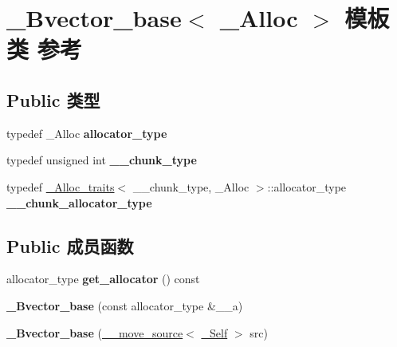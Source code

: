 \hypertarget{class___bvector__base}{}\section{\+\_\+\+Bvector\+\_\+base$<$ \+\_\+\+Alloc $>$ 模板类 参考}
\label{class___bvector__base}
\subsection*{Public 类型}
\begin{DoxyCompactItemize}
\item 
\mbox{\label{class___bvector__base_a79d8b0ab0a93495312341dc18a9563a1}} 
typedef \+\_\+\+Alloc {\bfseries allocator\+\_\+type}
\item 
\mbox{\label{class___bvector__base_a19e33337e31301ec461cfc6e481de671}} 
typedef unsigned int {\bfseries \+\_\+\+\_\+chunk\+\_\+type}
\item 
\mbox{\label{class___bvector__base_a406f2f62121d3248666287474370c6a8}} 
typedef \hyperlink{struct___alloc__traits}{\+\_\+\+Alloc\+\_\+traits}$<$ \+\_\+\+\_\+chunk\+\_\+type, \+\_\+\+Alloc $>$\+::allocator\+\_\+type {\bfseries \+\_\+\+\_\+chunk\+\_\+allocator\+\_\+type}
\end{DoxyCompactItemize}
\subsection*{Public 成员函数}
\begin{DoxyCompactItemize}
\item 
\mbox{\label{class___bvector__base_acdc811789287e3831f1e197d1ba24bc6}} 
allocator\+\_\+type {\bfseries get\+\_\+allocator} () const
\item 
\mbox{\label{class___bvector__base_a511e80eebb8b2fb30ea3de87c8c6210f}} 
{\bfseries \+\_\+\+Bvector\+\_\+base} (const allocator\+\_\+type \&\+\_\+\+\_\+a)
\item 
\mbox{\label{class___bvector__base_a2e5c0c0f6d2ed05f895b74107f34f380}} 
{\bfseries \+\_\+\+Bvector\+\_\+base} (\hyperlink{class____move__source}{\+\_\+\+\_\+move\+\_\+source}$<$ \hyperlink{class___bvector__base}{\+\_\+\+Self} $>$ src)
\end{DoxyCompactItemize}
